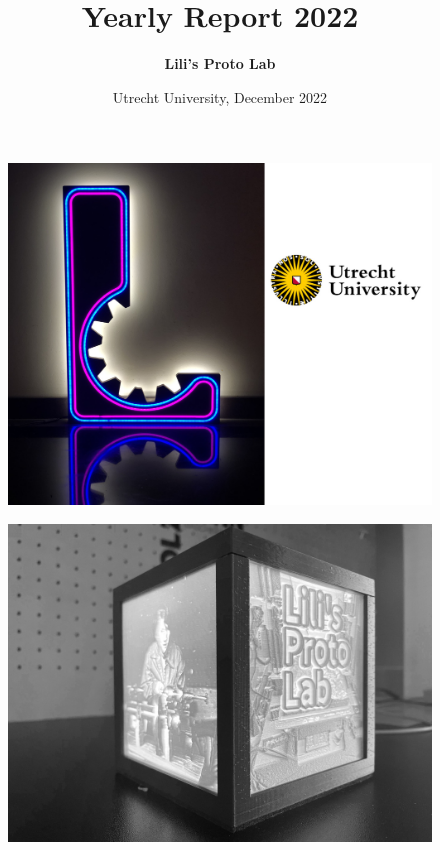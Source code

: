 \documentclass{report}
\title{\fontsize{60}{60}\bfseries Yearly Report 2022}
\author{\fontsize{80}{80}\bfseries Lili's Proto Lab}
\date{Utrecht University, December 2022}
\begin{document}
\maketitle
\thispagestyle{empty}

\begin{figure}
    \centering
    \includegraphics[height=\textheight]{design_images/neon_L.jpg}
\end{figure}
\clearpage

\begin{figure}
    \centering
    \includegraphics[height=\textheight]{design_images/cube.jpg}
\end{figure}
\clearpage
\tableofcontents
\clearpage
\end{document}

